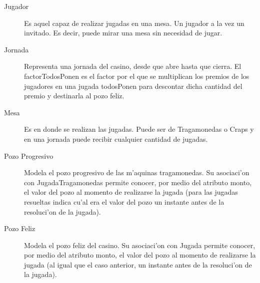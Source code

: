 \begin{description}
\item [Jugador] Es aquel capaz de realizar jugadas en una mesa. Un jugador  a la vez un invitado. Es decir, puede mirar una mesa sin necesidad de jugar.
\item [Jornada] Representa una jornada del casino, desde que abre hasta que cierra. El factorTodosPonen es el factor por el que se multiplican los premios de los jugadores en una jugada todosPonen para descontar dicha cantidad del premio y destinarla al pozo feliz.
\item [Mesa] Es en donde se realizan las jugadas. Puede ser de Tragamonedas o Craps y en una jornada puede recibir cualquier cantidad de jugadas.
\item [Pozo Progresivo] Modela el pozo progresivo de las m'aquinas tragamonedas. Su asociaci'on con JugadaTragamonedas permite conocer, por medio del atributo monto, el valor del pozo al momento de realizarse la jugada (para las jugadas resueltas indica cu'al era el valor del pozo un instante antes de la resoluci'on de la jugada).
\item [Pozo Feliz] Modela el pozo feliz del casino. Su asociaci'on con Jugada permite conocer, por medio del atributo monto, el valor del pozo al momento de realizarse la jugada (al igual que el caso anterior, un instante antes de la resoluci'on de la jugada).

\end{description}


